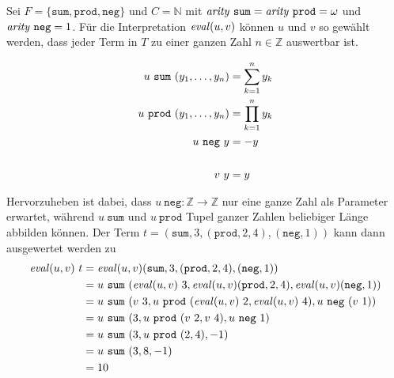 \begin{beispiel} \label{bEval}
Sei $F = \{\texttt{sum}, \texttt{prod}, \texttt{neg} \}$ und $C = \mathbb{N}$ mit $\mathit{arity}~ \texttt{sum} = \mathit{arity}~ \texttt{prod} = \omega$ und $\mathit{arity}~ \texttt{neg} = 1$.
Für die Interpretation $\mathit{eval}(u, v)$ können $u$ und $v$ so gewählt werden, dass jeder Term in $T$ zu einer ganzen Zahl $n \in \mathbb{Z}$ auswertbar ist.

\begin{equation*}
    \begin{split}
    u~\texttt{sum}  ~({y}_{1}, \dots, {y}_{n}) &=  \sum_{k = 1}^n y_k\\
    u~\texttt{prod} ~({y}_{1}, \dots, {y}_{n}) &= \prod_{k = 1}^n y_k\\
    u~\texttt{neg}~y &= -y\\
    &\\
    v~y &= y
    \end{split}
\end{equation*}

Hervorzuheben ist dabei, dass $u~\texttt{neg} \colon \mathbb Z \rightarrow \mathbb Z$ nur eine ganze Zahl als \Gls{Parameter} erwartet, während $u~\texttt{sum}$ und $u~\texttt{prod}$ Tupel ganzer Zahlen beliebiger Länge abbilden können.
Der Term $t = (\texttt{sum}, 3, (\texttt{prod}, 2, 4), (\texttt{neg}, 1))$ kann dann ausgewertet werden zu 
\begin{equation*}
    \begin{split}
    \mathit{eval}(u, v)~t &= \mathit{eval}(u, v) (\texttt{sum}, 3, (\texttt{prod}, 2, 4), (\texttt{neg}, 1)) \\
    &= u~\texttt{sum}~(\mathit{eval}(u, v)~3, \mathit{eval}(u, v)(\texttt{prod}, 2, 4),  \mathit{eval}(u, v) (\texttt{neg}, 1)) \\
    &= u~\texttt{sum}~(v~3, u~\texttt{prod}~(\mathit{eval}(u, v)~2, \mathit{eval}(u, v)~4), u~\texttt{neg}~ (v~1)) \\
    &= u~\texttt{sum}~(3, u~\texttt{prod}~(v~2, v~4), u~\texttt{neg}~ 1) \\
    &= u~\texttt{sum}~(3, u~\texttt{prod}~(2, 4), -1) \\
    &= u~\texttt{sum}~( 3, 8, -1) \\
    &= 10 \\
    \end{split}
\end{equation*}
\end{beispiel}


